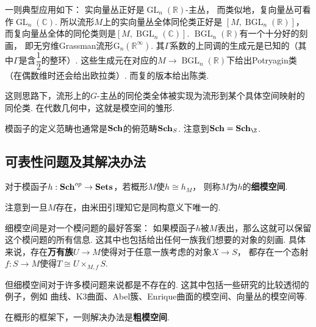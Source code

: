     一则典型应用如下：
    实向量丛正好是$\operatorname{GL}_{n}(\mathbb{R})$-主丛，
    而类似地，复向量丛可看作$\operatorname{GL}_{n}(\mathbb{C})$.
    所以流形$M$上的实向量丛全体同伦类正好是
    $[M,\operatorname{BGL}_{n}(\mathbb{R})]$，
    而复向量丛全体的同伦类则是$[M,\operatorname{BGL}_{n}(\mathbb{C})]$.
    $\operatorname{BGL}_{n}(\mathbb{R})$有一个十分好的刻画，
    即无穷维Grassman流形$\mathrm{G}_{n}(\mathbb{R}^{\infty})$.
    其$\Gamma$系数的上同调的生成元是已知的（其中$\Gamma$是含$\dfrac{1}{2}$的整环）.
    这些生成元在对应的$M \to \operatorname{BGL}_{n}(\mathbb{R})$下给出Potryagin类
    （在偶数维时还会给出欧拉类）. 而复的版本给出陈类.
    
    这则思路下，流形上的$G$-主丛的同伦类全体被实现为流形到某个具体空间映射的同伦类.
    在代数几何中，这就是模空间的雏形.

    模函子的定义范畴也通常是$\mathbf{Sch}$的俯范畴$\mathbf{Sch}_{S}$. 
    注意到$\Sch = \sch{\Z}$.

    \subsection{可表性问题及其解决办法}

    \begin{definition}
        对于模函子$h:\mathbf{Sch}^{op} \to \mathbf{Sets}$，若概形$M$使$h \cong h_{M}$，
        则称$M$为$h$的\textbf{细模空间}. 
        
        注意到一旦$M$存在，由米田引理知它是同构意义下唯一的.
    \end{definition}

    细模空间是对一个模问题的最好答案：
    如果模函子$h$被$M$表出，那么这就可以保留这个模问题的所有信息.
    这其中也包括给出任何一族我们想要的对象的刻画.
    具体来说，存在\textbf{万有族}$U \to M$使得对于任意一族考虑的对象$X \to S$，
    都存在一个态射$f:S \to M$使得$T \cong U \times_{M,f} S$.

    但细模空间对于许多模问题来说都是不存在的. 这其中包括一些研究的比较透彻的例子，例如
    曲线、K3曲面、Abel簇、Enrique曲面的模空间、向量丛的模空间等.

    在概形的框架下，一则解决办法是\textbf{粗模空间}.

